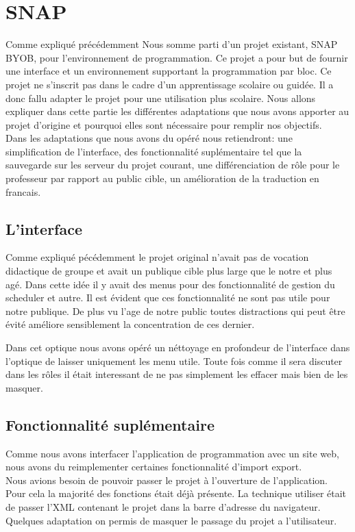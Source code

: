 \section{SNAP}
Comme expliqué précédemment Nous somme parti d'un projet existant, SNAP BYOB, pour l'environnement de programmation. Ce projet a pour but de fournir une interface et un environnement supportant la programmation par bloc. Ce projet ne s'inscrit pas dans le cadre d'un apprentissage scolaire ou guidée. Il a donc fallu adapter le projet pour une utilisation plus scolaire. Nous allons expliquer dans cette partie les différentes adaptations que nous avons apporter au projet d'origine et pourquoi elles sont nécessaire pour remplir nos objectifs.\\

Dans les adaptations que nous avons du opéré nous retiendront: une simplification de l'interface, des fonctionnalité suplémentaire tel que la sauvegarde sur les serveur du projet courant, une différenciation de rôle pour le professeur par rapport au public cible, un amélioration de la traduction en francais.

\subsection{L'interface}
Comme expliqué pécédemment le projet original n'avait pas de vocation didactique de groupe et avait un publique cible plus large que le notre et plus agé. Dans cette idée il y avait  des menus pour des fonctionnalité de gestion du scheduler et autre. Il est évident que ces fonctionnalité ne sont pas utile pour notre publique. De plus vu l'age de notre public toutes distractions qui peut être évité améliore sensiblement la concentration de ces dernier.

Dans cet optique nous avons opéré un néttoyage en profondeur de l'interface dans l'optique de laisser uniquement les menu utile. Toute fois comme il sera discuter dans les rôles il était interessant de ne pas simplement les effacer mais bien de les masquer.

\subsection{Fonctionnalité suplémentaire}
Comme nous avons interfacer l'application de programmation avec un site web, nous avons du reimplementer certaines fonctionnalité d'import export.\\

Nous avions besoin de pouvoir passer le projet à l'ouverture de l'application. Pour cela la majorité des fonctions était déjà présente. La technique utiliser était de passer l'XML contenant le projet dans la barre d'adresse du navigateur. Quelques adaptation on permis de masquer le passage du projet a l'utilisateur.\\

